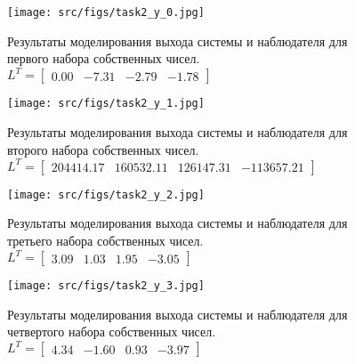 \begin{figure}[ht!]
    \centering
    \texttt{[image: src/figs/task2\_y\_0.jpg]}
    \caption{Результаты моделирования выхода системы и наблюдателя для первого набора собственных чисел. \(L^T = \begin{bmatrix} 0.00 & -7.31 & -2.79 & -1.78 \end{bmatrix}\)}
    \label{fig:task2_y_1}
\end{figure}
\begin{figure}[ht!]
    \centering
    \texttt{[image: src/figs/task2\_y\_1.jpg]}
    \caption{Результаты моделирования выхода системы и наблюдателя для второго набора собственных чисел. \(L^T = \begin{bmatrix} 204414.17 &  160532.11 &  126147.31 & -113657.21 \end{bmatrix}\)}
    \label{fig:task2_y_2}
\end{figure}
\begin{figure}[ht!]
    \centering
    \texttt{[image: src/figs/task2\_y\_2.jpg]}
    \caption{Результаты моделирования выхода системы и наблюдателя для третьего набора собственных чисел. \(L^T = \begin{bmatrix} 3.09 &  1.03 &  1.95 & -3.05 \end{bmatrix}\)}
    \label{fig:task2_y_3}
\end{figure}
\begin{figure}[ht!]
    \centering
    \texttt{[image: src/figs/task2\_y\_3.jpg]}
    \caption{Результаты моделирования выхода системы и наблюдателя для четвертого набора собственных чисел. \(L^T = \begin{bmatrix} 4.34 & -1.60 &  0.93 & -3.97 \end{bmatrix}\)}
    \label{fig:task2_y_4}
\end{figure}

\FloatBarrier